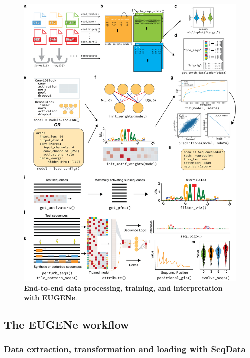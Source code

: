 \begin{figure}[!htbp]
    \centering
    \includegraphics[height=0.8\textheight, keepaspectratio]{1_figures-and-files/extended_data_figure3.png}
    \caption[End-to-end data processing, training, and interpretation with EUGENe]{\textbf{End-to-end data processing, training, and interpretation with EUGENe}.}
    \label{fig:1 Figure 5}
\end{figure}

\clearpage

\subsection{The EUGENe workflow}

\subsubsection{Data extraction, transformation and loading with SeqData}

